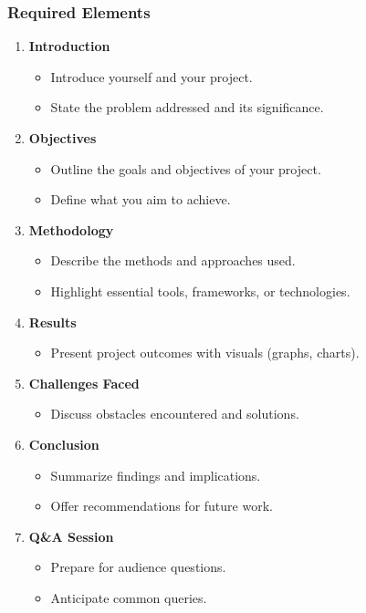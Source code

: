 \documentclass{beamer}
\begin{document}
\begin{frame}[fragile]
    \frametitle{Required Elements}
    \begin{enumerate}
        \item \textbf{Introduction}
            \begin{itemize}
                \item Introduce yourself and your project.
                \item State the problem addressed and its significance.
            \end{itemize}
        \item \textbf{Objectives}
            \begin{itemize}
                \item Outline the goals and objectives of your project.
                \item Define what you aim to achieve.
            \end{itemize}
        \item \textbf{Methodology}
            \begin{itemize}
                \item Describe the methods and approaches used.
                \item Highlight essential tools, frameworks, or technologies.
            \end{itemize}
        \item \textbf{Results}
            \begin{itemize}
                \item Present project outcomes with visuals (graphs, charts).
            \end{itemize}
        \item \textbf{Challenges Faced}
            \begin{itemize}
                \item Discuss obstacles encountered and solutions.
            \end{itemize}
        \item \textbf{Conclusion}
            \begin{itemize}
                \item Summarize findings and implications.
                \item Offer recommendations for future work.
            \end{itemize}
        \item \textbf{Q\&A Session}
            \begin{itemize}
                \item Prepare for audience questions.
                \item Anticipate common queries.
            \end{itemize}
    \end{enumerate}
\end{frame}
\end{document}
